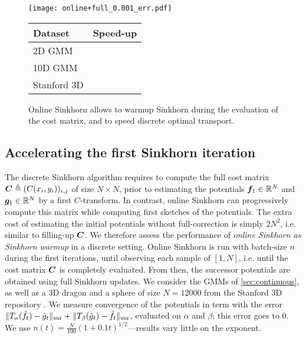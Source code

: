 \begin{figure}[t]
    \begin{minipage}{.7\textwidth}
    \texttt{[image: online+full\_0.001\_err.pdf]}
    \caption{Online Sinkhorn allows to warmup Sinkhorn during the evaluation of the cost matrix, and to speed discrete optimal transport.}
    \label{fig:warmup}
    \end{minipage}%
    \hfill
    \begin{minipage}{.25\textwidth}
        \small
        \begin{tabular}{lc}
            Dataset & Speed-up\\
            \toprule
            2D GMM & \\
            10D GMM & \\
            Stanford 3D & \\
            \bottomrule
        \end{tabular}
    \end{minipage}
\end{figure}


\subsection{Accelerating the first Sinkhorn iteration}\label{sec:accelerating}

The discrete Sinkhorn algorithm requires to compute the full cost matrix $\bm{C}
\triangleq (C(x_i,y_i))_{i,j}$  of size $N \times N$, prior to estimating the
potentials $\bm{f}_1 \in \mathbb{R}^N$ and $\bm{g}_1 \in \mathbb{R}^N$ by a first $C$-transform. In
contrast, online Sinkhorn can progressively compute this matrix while computing
first sketches of the potentials. The extra cost of estimating the initial potentials
without full-correction is simply $2 N^2$, i.e. similar to filling-up $\bm{C}$. We
therefore assess the performance of \textit{online Sinkhorn as Sinkhorn warmup}
in a discrete setting. Online Sinkhorn is run with batch-size $n$ during the
first iterations, until observing each sample of $[1,N]$, i.e. until the cost
matrix $\bm{C}$ is completely evaluated. From then, the
successor potentials are obtained using full Sinkhorn updates. We consider the
GMMs of \autoref{sec:continuous}, as well as a 3D dragon and a sphere of size $N=12000$ from
the Stanford 3D repository \cite{}. We measure
convergence of the potentials in term with the error $\Vert
T_{\alpha}(\hat f_t) - \hat g_t \Vert_{\text{\upshape var}} + \Vert T_{\beta}(\hat
g_t) - \hat f_t \Vert_{\text{\upshape var}}$, evaluated on $\alpha$ and $\beta$; this error
goes to $0$. We use $n(t) = \frac{N}{100} (1+0.1t)^{1/2}$---results vary little on the exponent.


